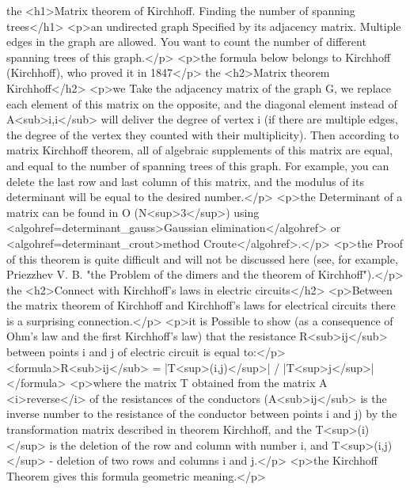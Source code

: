 the <h1>Matrix theorem of Kirchhoff. Finding the number of spanning trees</h1>
<p>an undirected graph Specified by its adjacency matrix. Multiple edges in the graph are allowed. You want to count the number of different spanning trees of this graph.</p>
<p>the formula below belongs to Kirchhoff (Kirchhoff), who proved it in 1847</p>
the <h2>Matrix theorem Kirchhoff</h2>
<p>we Take the adjacency matrix of the graph G, we replace each element of this matrix on the opposite, and the diagonal element instead of A<sub>i,i</sub> will deliver the degree of vertex i (if there are multiple edges, the degree of the vertex they counted with their multiplicity). Then according to matrix Kirchhoff theorem, all of algebraic supplements of this matrix are equal, and equal to the number of spanning trees of this graph. For example, you can delete the last row and last column of this matrix, and the modulus of its determinant will be equal to the desired number.</p>
<p>the Determinant of a matrix can be found in O (N<sup>3</sup>) using <algohref=determinant_gauss>Gaussian elimination</algohref> or <algohref=determinant_crout>method Croute</algohref>.</p>
<p>the Proof of this theorem is quite difficult and will not be discussed here (see, for example, Priezzhev V. B. "the Problem of the dimers and the theorem of Kirchhoff").</p>
the <h2>Connect with Kirchhoff's laws in electric circuits</h2>
<p>Between the matrix theorem of Kirchhoff and Kirchhoff's laws for electrical circuits there is a surprising connection.</p>
<p>it is Possible to show (as a consequence of Ohm's law and the first Kirchhoff's law) that the resistance R<sub>ij</sub> between points i and j of electric circuit is equal to:</p>
<formula>R<sub>ij</sub> = |T<sup>(i,j)</sup>| / |T<sup>j</sup>|</formula>
<p>where the matrix T obtained from the matrix A <i>reverse</i> of the resistances of the conductors (A<sub>ij</sub> is the inverse number to the resistance of the conductor between points i and j) by the transformation matrix described in theorem Kirchhoff, and the T<sup>(i)</sup> is the deletion of the row and column with number i, and T<sup>(i,j)</sup> - deletion of two rows and columns i and j.</p>
<p>the Kirchhoff Theorem gives this formula geometric meaning.</p>